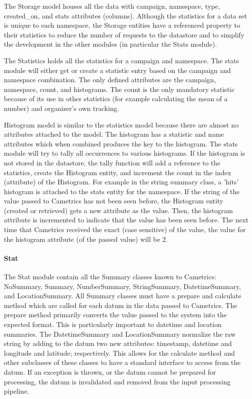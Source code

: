 \documentclass[10pt,a4paper,english]{article}
\begin{document}
The Storage model houses all the data with campaign, namespace, type, created{\_}on, and stats attributes (columns). Although the statistics for a data set is unique to each namespace, the Storage entities have a referenced property to their statistics to reduce the number of requests to the datastore and to simplify the development in the other modules (in particular the Stats module).

The Statistics holds all the statistics for a campaign and namespace. The stats module will either get or create a statistic entry based on the campaign and namespace combination. The only defined attributes are the campaign, namespace, count, and histograms. The count is the only mandatory statistic because of its use in other statistics (for example calculating the mean of a number) and organizer's own tracking.

Histogram model is similar to the statistics model because there are almost no attributes attached to the model. The histogram has a statistic and name attributes which when combined produces the key to the histogram. The stats module will try to tally all occurrences to various histograms. If the histogram is not stored in the datastore, the tally function will add a reference to the statistics, create the Histogram entity, and increment the count in the index (attribute) of the Histogram. For example in the string summary class, a 'hits' histogram is attached to the stats entity for the namespace. If the string of the value passed to Cametrics has not been seen before, the Histogram entity (created or retrieved) gets a new attribute as the value. Then, the histogram attribute is incremented to indicate that the value has been seen before. The next time that Cametrics received the exact (case sensitive) of the value, the value for the histogram attribute (of the passed value) will be 2.



\hypertarget{stat}{}
\paragraph*{Stat}
\label{stat}

The Stat module contain all the Summary classes known to Cametrics: NoSummary, Summary, NumberSummary, StringSummary, DatetimeSummary, and LocationSummary. All Summary classes must have a prepare and calculate method which are called for each datum in the data passed to Cametrics. The prepare method primarily converts the value passed to the system into the expected format. This is particularly important to datetime and location summaries. The DatetimeSummary and LocationSummary normalize the raw string by adding to the datum two new attributes: timestamp, datetime and longitude and latitude; respectively. This allows for the calculate method and other subclasses of these classes to have a standard interface to access from the datum. If an exception is thrown, or the datum cannot be prepared for processing, the datum is invalidated and removed from the input processing pipeline.
\end{document}
